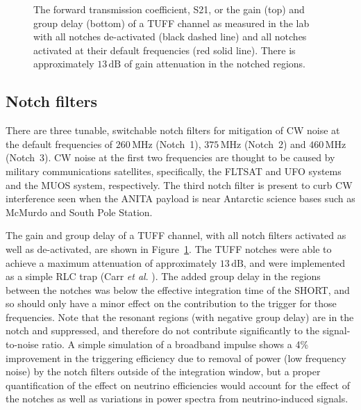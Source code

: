 \documentclass[preprint,12pt]{elsarticle}
\begin{document}
\begin{figure}[H]
\centering
{}
\caption{The forward transmission coefficient, S21, or the gain (top) and group delay (bottom) of a TUFF channel as measured in the lab with all notches de-activated (black dashed line) and all notches activated at their default frequencies (red solid line). There is approximately $13\, \mathrm{dB}$ of gain attenuation in the notched regions.
}
\label{s21}
\end{figure}


\subsection{Notch filters} 

There are three tunable, switchable notch filters 
for mitigation of CW noise at the default frequencies of $260\,\mbox{MHz}$ (Notch~1), $375\,\mbox{MHz}$ (Notch~2) 
and $460\,\mbox{MHz}$ (Notch~3).
CW noise at the first two frequencies are thought to be caused by military communications satellites, specifically, the FLTSAT and UFO systems and the MUOS system, respectively. 
The third notch filter is present to curb CW interference seen when the ANITA payload is near Antarctic science bases such as McMurdo and South Pole Station. 

The gain and group delay of a TUFF channel, with all notch filters activated as well as de-activated, are shown in Figure~\ref{s21}. 
The TUFF notches were able to achieve a maximum attenuation of approximately $13\, \mathrm{dB}$, 
and were implemented as a simple RLC trap (Carr \textit{et al}. \cite{handbook}).
The added group delay in the regions between 
the notches was below the effective integration time of the SHORT,
 and so should only have a minor effect on the contribution to the 
 trigger for those frequencies. Note that the resonant regions 
 (with negative group delay) are in the notch and suppressed, 
 and therefore do not contribute significantly to the signal-to-noise ratio. 
 A simple simulation of a broadband impulse shows a 4\% 
 improvement in the triggering efficiency due to removal of power 
 (low frequency noise) by the notch filters outside of the integration window, 
 but a proper quantification of the effect on neutrino efficiencies would 
 account for the effect of the notches as well as variations in power 
 spectra from neutrino-induced signals.
\end{document}
